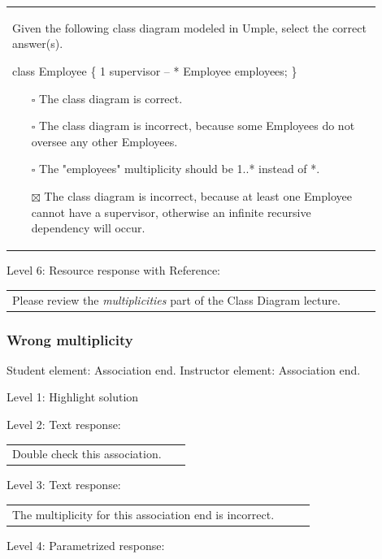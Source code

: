 \begin{tabular}{|p{0.9\linewidth}}

Given the following class diagram modeled in Umple, select the correct answer(s).

class Employee \{ 1 supervisor -- * Employee employees; \}

\begin{itemize}
    \item[$\square$] The class diagram is correct.
    \item[$\square$] The class diagram is incorrect, because some Employees do not oversee any other Employees.
    \item[$\square$] The "employees" multiplicity should be 1..* instead of *.
    \item[$\boxtimes$] The class diagram is incorrect, because at least one Employee cannot have a supervisor, otherwise an infinite recursive dependency will occur.
\end{itemize}

\end{tabular} \medskip

\noindent Level 6: Resource response with Reference: \medskip

\begin{tabular}{|p{0.9\linewidth}}
Please review the \textit{multiplicities} part of the Class Diagram lecture.
\end{tabular} \medskip


\subsubsection{Wrong multiplicity}

Student element: Association end. Instructor element: Association end. \medskip

\noindent Level 1: Highlight solution  \medskip

\noindent Level 2: Text response: \medskip

\begin{tabular}{|p{0.9\linewidth}}
Double check this association.
\end{tabular} \medskip

\noindent Level 3: Text response: \medskip

\begin{tabular}{|p{0.9\linewidth}}
The multiplicity for this association end is incorrect.
\end{tabular} \medskip

\noindent Level 4: Parametrized response: \medskip

